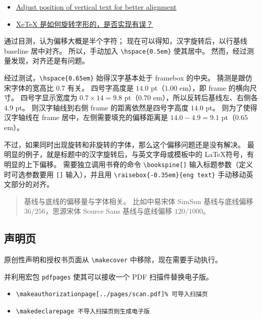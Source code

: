 \documentclass[../Main/thesis.tex]{subfiles}
\begin{document}
\begin{itemize}
\item
  \href{https://sourceforge.net/p/xetex/bugs/164/}{Adjust position of
  vertical text for better alignment}
\item
  \href{https://github.com/CTeX-org/forum/issues/93}{XeTeX
  是如何旋转字形的，是否实现有误？}
\end{itemize}

通过目测，认为偏移大概是半个字符； 现在可以得知，汉字旋转后，以行基线
baseline 居中对齐。 所以，手动加入
\texttt{\textbackslash{}hspace\{0.5em\}} 使其居中。
然而，经过测量发现，对齐还是有问题。

经过测试，\texttt{\textbackslash{}hspace\{0.65em\}} 始得汉字基本处于
framebox 的中央。 猜测是跟仿宋字体的宽高比 \(0.7\) 有关。 四号字高度是
\(14.0\) pt（\(1.00\) em），即 frame 的横向尺寸。 四号字显示宽度为
\(0.7 \times 14 = 9.8\) pt（\(0.70\) em），所以反转后基线左、右侧各
\(4.9\) pt。 则汉字轴线到右侧 frame 的距离依然是四号字高度 \(14.0\) pt。
则为了使得汉字轴线在 frame 居中，左侧需要填充的偏移距离是
\(14.0-4.9=9.1\) pt（\(0.65\) em）。

不过，如果同时出现旋转和非旋转的字体，那么这个偏移问题还是没有解决。
最明显的例子，就是标题中的汉字旋转后，与英文字母或模板中的 \LaTeX 符号，有明显的上下偏移。 需要独立调用书脊的命令
\texttt{\textbackslash{}bookspine[]}
输入标题参数（定义时可选参数要用 \texttt{[]} 输入），并且用
\texttt{\textbackslash{}raisebox\{-0.35em\}\{eng\ text\}}
手动移动英文部分的对齐。

\begin{quote}
基线与底线的偏移量与字体相关。 比如中易宋体 SimSun 基线与底线偏移
\(36/256\)，思源宋体 Source Sans 基线与底线偏移 \(120/1000\)。
\end{quote}

\subsection{声明页}

原创性声明和授权书页面从 \texttt{\textbackslash{}makecover}
中移除，现在需要手动执行。

并利用宏包 \texttt{pdfpages} 使其可以接收一个 PDF 扫描件替换电子版。

\begin{itemize}
\item
  \texttt{\textbackslash{}makeauthorizationpage[../pages/scan.pdf]\%\ 可导入扫描页}
\item
  \texttt{\textbackslash{}makedeclarepage\ 不导入扫描页则生成电子版}
\end{itemize}
\end{document}
